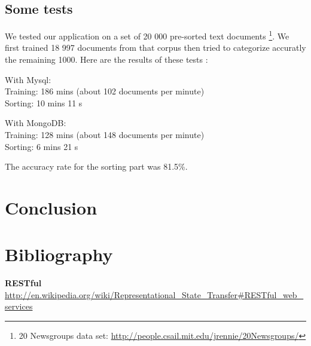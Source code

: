 \documentclass[a4paper,11pt]{article}
\begin{document}
\subsection{Some tests}
    
We tested our application on a set of 20 000 pre-sorted text documents
\footnote{20 Newsgroups data set: \url{http://people.csail.mit.edu/jrennie/20Newsgroups/}}.
We first trained 18 997 documents from that corpus then tried to categorize
accuratly the remaining 1000. Here are the results of these tests :

With Mysql:\\
Training: 186 mins (about 102 documents per minute)\\
Sorting: 10 mins 11 s

With MongoDB:\\
Training: 128 mins (about 148 documents per minute)\\
Sorting: 6 mins 21 s

The accuracy rate for the sorting part was 81.5\%.


\section*{Conclusion}



\clearpage
\section*{Bibliography}

\textbf{RESTful} \\
\url{http://en.wikipedia.org/wiki/Representational\_State\_Transfer\#RESTful\_web\_services}
\end{document}
